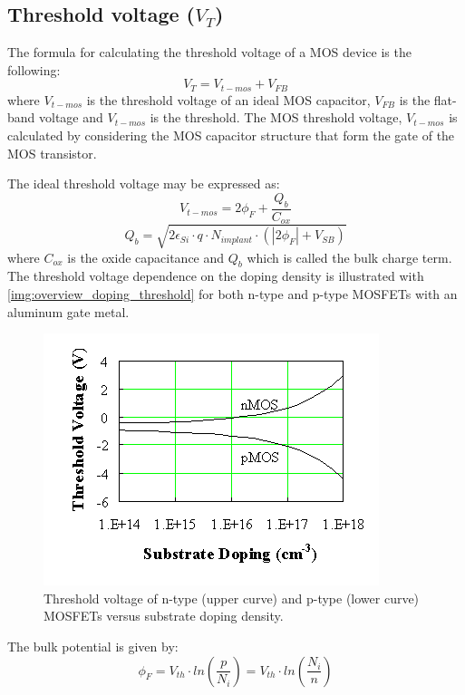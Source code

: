 \subsection{Threshold voltage ($V_T$)}
The formula for calculating the threshold voltage of a MOS device is the following:
\begin{equation}
V_T = V_{t-mos} + V_{FB}
\end{equation}
where $V_{t-mos}$ is the threshold voltage of an ideal MOS capacitor, $V_{FB}$ is the flat-band voltage and $V_{t-mos}$ is the threshold.
The MOS threshold voltage, $V_{t-mos}$ is calculated by considering the MOS capacitor structure that form the gate of the MOS transistor.

The ideal threshold voltage may be expressed as:
\begin{equation}
V_{t-mos}=2 \phi_F + \frac{Q_b}{C_{ox}}
\end{equation}
\begin{equation}
Q_b
=
\sqrt{2 \epsilon_{Si} \cdot q \cdot N_{implant}  \cdot  ( \left| 2 \phi_F \right| + V_{SB}) }
\end{equation}
where $C_{ox}$ is the oxide capacitance and $Q_b$ which is called the bulk charge term.\\

The threshold voltage dependence on the doping density is illustrated with \autoref{img:overview_doping_threshold} for both n-type and p-type MOSFETs with an aluminum gate metal.
\begin{figure}[H]
	\centering
	\includegraphics[scale=0.5]{doping_thresholds_overview.png}
	\caption{Threshold voltage of n-type (upper curve) and p-type (lower curve) MOSFETs versus substrate doping density.}
	\label{img:overview_doping_threshold}
\end{figure}

The bulk potential is given by:
\begin{equation}
\phi_F
=
V_{th} \cdot ln\left(\frac{p}{N_i}\right)
=
V_{th} \cdot ln\left(\frac{N_i}{n}\right)
\end{equation}

